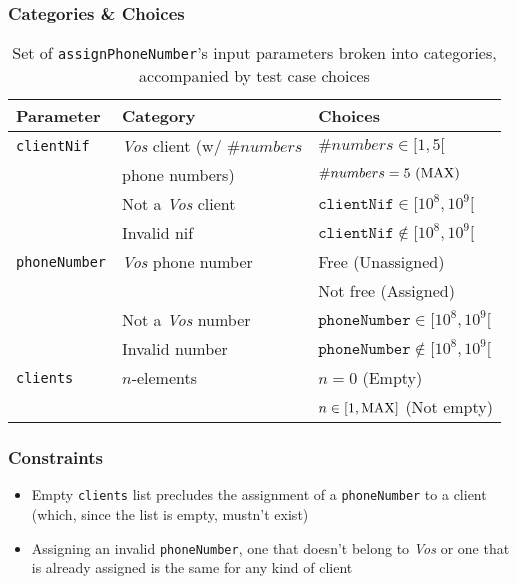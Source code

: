 \subsubsection{Categories \& Choices}
\label{sec:methods.assignPhoneNumber.choices}
\begin{table}[!hbtp]
  \centering
  \normalsize
  \begin{tabular}{|l|l|l|}
    \hline
    \textbf{Parameter} & \textbf{Category} & \textbf{Choices} \\ \hline
    \texttt{clientNif}
    & \textit{Vos} client (w/ $\#numbers$
      & $\#numbers \in [1,5[$     \\ \cline{3-3}
    & phone numbers)
      & $\#numbers = 5\ (\rm{MAX})$ \\ \cline{2-3}
    & Not a \textit{Vos} client
      & $\texttt{clientNif} \in [10^8,10^9[$ \\ \cline{2-3}
    & Invalid nif
      & $\texttt{clientNif} \notin [10^8,10^9[$ \\ \hline
    \texttt{phoneNumber}
    & \textit{Vos} phone number
      & Free (Unassigned)   \\ \cline{3-3}
    & & Not free (Assigned) \\ \cline{2-3}
    & Not a \textit{Vos} number
      & $\texttt{phoneNumber} \in [10^8,10^9[$\\ \cline{2-3}
    & Invalid number
      & $\texttt{phoneNumber} \notin [10^8,10^9[$ \\ \hline
    \texttt{clients}
    & $n$-elements
      & $n = 0$ (Empty)                  \\ \cline{3-3}
    & & $n \in [1,\rm{MAX}]$ (Not empty) \\ \hline
  \end{tabular}
  \caption[\texttt{assignPhoneNumber} categories \& choices]
    {Set of \texttt{assignPhoneNumber}'s input parameters broken into
      categories, accompanied by test case choices}
  \label{tab:methods.assignPhoneNumber.choices}
\end{table}

\subsubsection{Constraints}
\label{sec:methods.assignPhoneNumber.constraints}
\begin{itemize}
  \item Empty \texttt{clients} list precludes the assignment of a
        \texttt{phoneNumber} to a client (which, since the list is empty,
        mustn't exist)
  \item Assigning an invalid \texttt{phoneNumber}, one that doesn't belong to
        \textit{Vos} or one that is already assigned is the same for any kind of
        client
\end{itemize}

